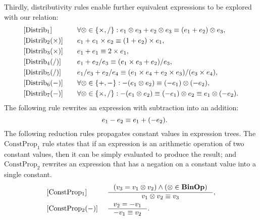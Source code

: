 Thirdly, distributivity rules enable further equivalent expressions to be
explored with our relation:
\begin{equation}
    \begin{aligned}{}
        & [\mathrm{Distrib}_1] & \quad &
            \forall \otimes \in \{ \times, / \}:
            e_1 \otimes e_3 + e_2 \otimes e_3
            \equiv (e_1 + e_2) \otimes e_3, \\
        & [\mathrm{Distrib}_2 (\times)] & \quad &
            e_1 + e_1 \times e_2 \equiv (1 + e_2) \times e_1, \\
        & [\mathrm{Distrib}_3 (\times)] & \quad &
            e_1 + e_1 \equiv 2 \times e_1, \\
        & [\mathrm{Distrib}_4 (/)] & \quad &
            e_1 + e_2 / e_3 \equiv (e_1 \times e_3 + e_2) / e_3, \\
        & [\mathrm{Distrib}_5 (/)] & \quad &
            e_1 / e_3 + e_2 / e_4 \equiv
            (e_1 \times e_4 + e_2 \times e_3) / (e_3 \times e_4), \\
        & [\mathrm{Distrib}_6 (-)] & \quad &
            \forall \otimes \in \{ +, - \}:
            -(e_1 \otimes e_2) \equiv (-e_1) \otimes (-e_2), \\
        & [\mathrm{Distrib}_7 (-)] & \quad &
            \forall \otimes \in \{ \times, / \}:
            -(e_1 \otimes e_2)
            \equiv (-e_1) \otimes e_2 \equiv e_1 \otimes (-e_2).
    \end{aligned}
\end{equation}
The following rule rewrites an expression with subtraction into an addition:
\begin{equation}
    [\mathrm{Subtract}] \quad
    e_1 - e_2 \eqrel e_1 + (-e_2).
\end{equation}
The following reduction rules propagates constant values in expression
trees. The $\mathrm{ConstProp}_1$ rule states that if an expression is an
arithmetic operation of two constant values, then it can be simply evaluated to
produce the result; and $\mathrm{ConstProp}_2$ rewrites an expression that has
a negation on a constant value into a single constant.
\begin{equation}
    \begin{aligned}{}
        & [\mathrm{ConstProp_1}] &~&
        \inference{%
            (v_3 = v_1 \opsymbol v_2) \wedge
            (\opsymbol \in \binopset)
        }{%
            v_1 \opsymbol v_2 \eqrel v_3
        }, \\
        & [\mathrm{ConstProp_2} (-)] &~&
        \inference{%
            v_2 = -v_1
        }{%
            -v_1 \eqrel v_2
        }.
    \end{aligned}
    \label{so:eq:constant_propagation}
\end{equation}
